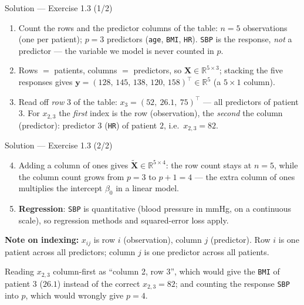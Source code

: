 \documentclass[aspectratio=169,11pt]{beamer}
\begin{document}
\begin{frame}{Solution --- Exercise 1.3 (1/2)}
\begin{solutionbox}
\begin{enumerate}
  \item Count the rows and the predictor columns of the table:
        $n = 5$ observations (one per patient); $p = 3$ predictors
        (\texttt{age}, \texttt{BMI}, \texttt{HR}). \texttt{SBP} is the
        response, \emph{not} a predictor --- the variable we model is
        never counted in $p$.
  \item Rows $=$ patients, columns $=$ predictors, so
        $\mathbf{X}\in\mathbb{R}^{5\times 3}$; stacking the five
        responses gives
        $\mathbf{y}=(128,\,145,\,138,\,120,\,158)^\top
        \in\mathbb{R}^{5}$ (a $5\times1$ column).
  \item Read off \emph{row} 3 of the table:
        $x_3 = (52,\ 26.1,\ 75)^\top$ --- all predictors of patient 3.
        For $x_{2,3}$ the \emph{first} index is the row (observation),
        the \emph{second} the column (predictor): predictor $3$
        (\texttt{HR}) of patient $2$, i.e.\ $x_{2,3}=82$.
\end{enumerate}
\end{solutionbox}
\end{frame}

\begin{frame}{Solution --- Exercise 1.3 (2/2)}
\begin{solutionbox}
\begin{enumerate}\setcounter{enumi}{3}
  \item Adding a column of ones gives
        $\tilde{\mathbf{X}}\in\mathbb{R}^{5\times 4}$: the row count
        stays at $n=5$, while the column count grows from $p=3$ to
        $p+1=4$ --- the extra column of ones multiplies the intercept
        $\beta_0$ in a linear model.
  \item \textbf{Regression}: \texttt{SBP} is quantitative (blood
        pressure in mmHg, on a continuous scale), so regression
        methods and squared-error loss apply.
\end{enumerate}
\textbf{Note on indexing:} $x_{ij}$ is row $i$ (observation),
column $j$ (predictor). Row $i$ is one patient across all predictors;
column $j$ is one predictor across all patients.
\end{solutionbox}
\begin{mistake}
Reading $x_{2,3}$ column-first as ``column 2,
row 3'', which would give the \texttt{BMI} of patient 3 ($26.1$)
instead of the correct $x_{2,3}=82$; and counting the response
\texttt{SBP} into $p$, which would wrongly give $p=4$.
\end{mistake}
\end{frame}
\end{document}
